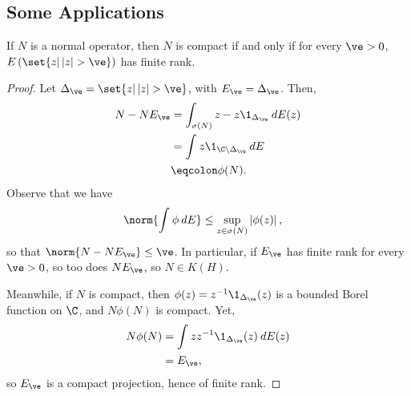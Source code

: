 \documentclass[10pt]{mypackage}
\begin{document}
\subsection{Some Applications}%
\begin{proposition}
  If $N$ is a normal operator, then $N$ is compact if and only if for every $\ve > 0$, $E\left( \set{z | \left\vert z \right\vert > \ve} \right)$ has finite rank.
\end{proposition}
\begin{proof}
  Let $\Delta_{\ve} = \set{z | \left\vert z \right\vert > \ve}$, with $E_{\ve} = \Delta_{\ve}$. Then,
  \begin{align*}
    N - NE_{\ve} &= \int_{\sigma(N)}^{} z-z\1_{\Delta_{\ve}}\:dE(z)\\
                 &= \int_{}^{} z\1_{\C\setminus \Delta_{\ve}}\:dE\\
                 &\eqcolon \phi(N).
  \end{align*}
  Observe that we have
  \begin{align*}
    \norm{ \int_{}^{} \phi\:dE } &\leq \sup_{z\in\sigma(N)}\left\vert \phi(z) \right\vert,
  \end{align*}
  so that $\norm{N-NE_{\ve}} \leq \ve$. In particular, if $E_{\ve}$ has finite rank for every $\ve > 0$, so too does $NE_{\ve}$, so $N\in K(H)$.

  Meanwhile, if $N$ is compact, then $\phi(z) = z^{-1}\1_{\Delta_{\ve}}(z)$ is a bounded Borel function on $\C$, and $N\phi(N)$ is compact. Yet,
  \begin{align*}
    N\phi(N) &= \int_{}^{} zz^{-1}\1_{\Delta_{\ve}}(z)\:dE(z)\\
             &= E_{\ve},
  \end{align*}
  so $E_{\ve}$ is a compact projection, hence of finite rank.
\end{proof}
\nocite{pedersen_analysis_now,blackadar_operator_algebras,davidson_functional_analysis,conway_functional_analysis}
\printbibliography
\end{document}
